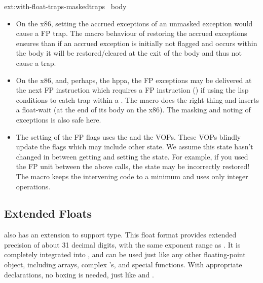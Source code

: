 \begin{defmac}{ext:}{with-float-traps-masked}{traps \ampbody\ body}
\begin{itemize}
  \item On the x86, setting the accrued exceptions of an unmasked
    exception would cause a FP trap. The macro behaviour of restoring
    the accrued exceptions ensures than if an accrued exception is
    initially not flagged and occurs within the body it will be
    restored/cleared at the exit of the body and thus not cause a
    trap.
    
  \item On the x86, and, perhaps, the hppa, the FP exceptions may be
    delivered at the next FP instruction which requires a FP
     instruction () if using the lisp
    conditions to catch trap within a .  The
     macro does the right thing and inserts a
    float-wait (at the end of its body on the x86).  The masking and
    noting of exceptions is also safe here.
    
  \item The setting of the FP flags uses the
     and the  VOPs. These VOPs blindly update
    the flags which may include other state.  We assume this state
    hasn't changed in between getting and setting the state. For
    example, if you used the FP unit between the above calls, the
    state may be incorrectly restored! The
     macro keeps the intervening code to
    a minimum and uses only integer operations.
  \end{itemize}

\end{defmac}

\subsection{Extended Floats}
\label{extended-float}

\cmucl{} also has an extension to support 
type.  This float format provides extended precision of about 31
decimal digits, with the same exponent range as .
It is completely integrated into \cmucl{}, and can be used just like
any other floating-point object, including arrays, complex
's, and special functions.  With appropriate
declarations, no boxing is needed, just like  and
. 

